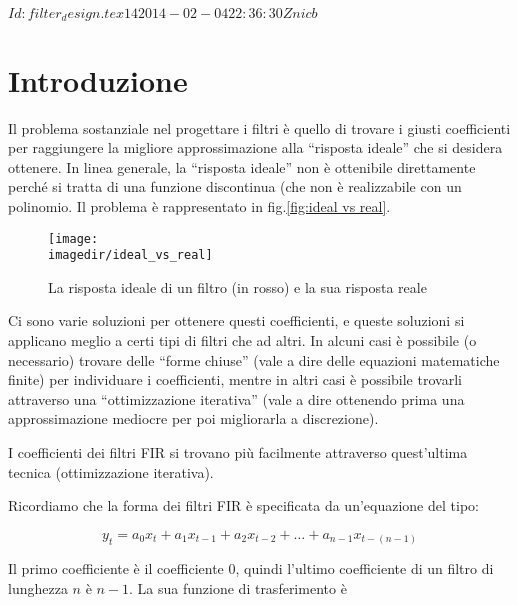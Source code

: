 %
%
%
\svnInfo $Id: filter_design.tex 14 2014-02-04 22:36:30Z nicb $

\section{Introduzione\label{sec: filter design introduction}}
%
%

Il problema sostanziale nel progettare i filtri \`e quello di trovare i giusti
coefficienti per raggiungere la migliore approssimazione alla ``risposta ideale''
che si desidera ottenere. In linea generale, la ``risposta ideale'' non \`e
ottenibile direttamente perch\'e si tratta di una funzione discontinua (che
non \`e realizzabile con un polinomio. Il problema \`e rappresentato in
fig.\vref{fig:ideal vs real}.
\begin{figure}[htbp]
	\begin{center}
		\texttt{[image: \\imagedir/ideal\_vs\_real]}
		\caption{La risposta ideale di un filtro (in rosso) e la sua risposta reale\label{fig:ideal vs real}}
	\end{center}
\end{figure}

Ci sono varie soluzioni per ottenere questi coefficienti, e queste soluzioni
si applicano meglio a certi tipi di filtri che ad altri.
In alcuni casi \`e possibile (o necessario) trovare delle ``forme chiuse''
(vale a dire delle equazioni matematiche finite) per individuare i
coefficienti, mentre in altri casi \`e possibile trovarli attraverso una
``ottimizzazione iterativa'' (vale a dire ottenendo prima una approssimazione
mediocre per poi migliorarla a discrezione).

I coefficienti dei filtri FIR si trovano pi\`u facilmente attraverso
quest'ultima tecnica (ottimizzazione iterativa).

%
%

Ricordiamo che la forma dei filtri FIR \`e specificata da un'equazione del
tipo:

\begin{equation}
	y_t = a_0 x_t + a_1 x_{t-1} + a_2 x_{t-2} + \dots + a_{n-1} x_{t-(n-1)}
\end{equation}

Il primo coefficiente \`e il coefficiente $0$, quindi l'ultimo coefficiente di
un filtro di lunghezza $n$ \`e $n-1$. La sua funzione di trasferimento \`e

